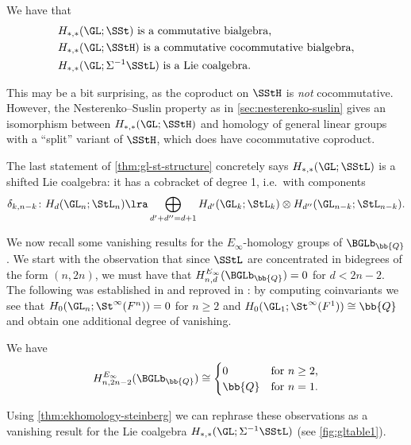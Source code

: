 \documentclass[a4paper]{amsart}
\begin{document}
\begin{theorem}\label{thm:gl-st-structure} We have that
    \begin{align*} &H_{*,*}(\GL;\SSt) \text{ is a commutative bialgebra,} \\
    &H_{*,*}(\GL;\SStH) \text{ is a commutative cocommutative bialgebra,} \\
    & H_{*,*}(\GL;\Sigma^{-1} \SStL) \text{ is a Lie coalgebra}.\end{align*}
\end{theorem}

\begin{remark}This may be a bit surprising, as the coproduct on $\SStH$ is \emph{not} cocommutative. However, the Nesterenko--Suslin property as in \cref{sec:nesterenko-suslin} gives an isomorphism between $H_{*,*}(\GL;\SStH)$ and homology of general linear groups with a ``split'' variant of $\SStH$, which does have cocommutative coproduct.
\end{remark}

The last statement of \cref{thm:gl-st-structure} concretely says $H_{*,*}(\GL;\SStL)$ is a shifted Lie coalgebra: it has a cobracket of degree 1, i.e.~with components
\[\delta_{k,n-k} \colon H_d(\GL_n;\StL_n) \lra \bigoplus_{d'+d''=d+1} H_{d'}(\GL_k; \StL_k) \otimes H_{d''}(\GL_{n-k}; \StL_{n-k}).\]

We now recall some vanishing results for the $E_\infty$-homology groups of $\BGLb_\bb{Q}$. We start with the observation that since $\SStL$ are concentrated in bidegrees of the form $(n,2n)$, we must have that $\smash{H^{E_\infty}_{n,d}(\BGLb_\bb{Q})} = 0$ for $d<2n-2$. The following was established in \cite[Theorem B]{GKRW20} and reproved in \cite[Corollary 38]{CharltonRadchenkoRudenko}: by computing coinvariants we see that $H_0(\GL_n;\St^\infty(F^n)) = 0$ for $n \geq 2$ and $H_0(\GL_1;\St^\infty(F^1)) \cong \bb{Q}$ and obtain one additional degree of vanishing.

\begin{theorem}\label{thm:bgl-critical-line-vanishing} We have
\[H^{E_\infty}_{n,2n-2}(\BGLb_\bb{Q}) \cong \begin{cases} 0 & \text{for $n \geq 2$,} \\
\bb{Q} & \text{for $n=1$.}\end{cases}\]
\end{theorem}

Using \cref{thm:ekhomology-steinberg} we can rephrase these observations as a vanishing result for the Lie coalgebra $H_{*,*}(\GL;\Sigma^{-1}\SStL)$ (see \cref{fig:gltable1}). 
\end{document}
